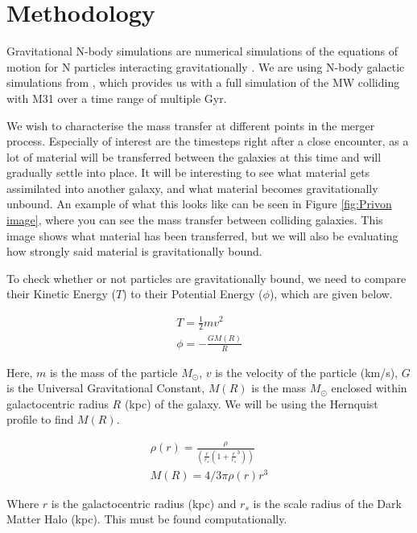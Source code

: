 \documentclass[linenumbers]{aastex631} %
\begin{document}
\section{Methodology}

Gravitational N-body simulations are numerical simulations of the equations of motion for N particles interacting gravitationally \citep{trenti2008gravitational}. We are using N-body galactic simulations from \citep{Besla}, which provides us with a full simulation of the MW colliding with M31 over a time range of multiple Gyr. 

We wish to characterise the mass transfer at different points in the merger process. Especially of interest are the timesteps right after a close encounter, as a lot of material will be transferred between the galaxies at this time and will gradually settle into place. It will be interesting to see what material gets assimilated into another galaxy, and what material becomes gravitationally unbound. An example of what this looks like can be seen in Figure \ref{fig:Privon image}, where you can see the mass transfer between colliding galaxies. This image shows what material has been transferred, but we will also be evaluating how strongly said material is gravitationally bound. 


To check whether or not particles are gravitationally bound, we need to compare their Kinetic Energy ($T$) to their Potential Energy ($\phi$), which are given below.

\begin{gather}
T = \frac{1}{2} mv^2 \\
\phi = -\frac{GM(R)}{R}
\end{gather}

Here, $m$ is the mass of the particle $M_\odot$, $v$ is the velocity of the particle (km/s), $G$ is the Universal Gravitational Constant, $M(R)$ is the mass $M_\odot$ enclosed within galactocentric radius $R$ (kpc) of the galaxy. We will be using the Hernquist profile \citep{1990ApJ...356..359H} to find $M(R)$.

\begin{gather}
    \rho(r) = \frac{\rho}{(\frac{r}{r_s}(1+\frac{r}{r_s}^3))}\\
    M(R) = 4/3\pi\rho(r)r^3
\end{gather}

Where $r$ is the galactocentric radius (kpc) and $r_s$ is the scale radius of the Dark Matter Halo (kpc). This must be found computationally.
\end{document}
